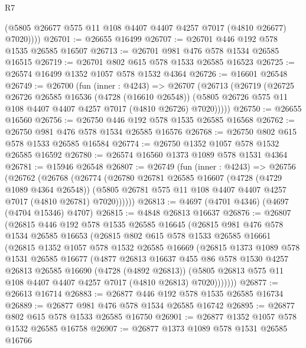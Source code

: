 \begin{lexlean}{R7}
\begin{coremodule}
          (@5805 @26677 @575 @11 @108 @4407 @4407 @4257 @7017 (@4810 @26677) @7020))))
@26701 := @26655 @16499
@26707 := @26701 @446 @192 @578 @1535 @26585 @16507
@26713 := @26701 @981 @476 @578 @1534 @26585 @16515
@26719 := @26701 @802 @615 @578 @1533 @26585 @16523
@26725 := @26574 @16499 @1352 @1057 @578 @1532 @4364
@26726 := @16601 @26548
@26749 := @26700
    (fun (inner : @4243) =>
    @26707
      (@26713
        (@26719
          (@26725
            @26726
            @26585
            @16536
            (@4728 (@16610 @26548))
            (@5805 @26726 @575 @11 @108 @4407 @4407 @4257 @7017 (@4810 @26726) @7020)))))
@26750 := @26655 @16560
@26756 := @26750 @446 @192 @578 @1535 @26585 @16568
@26762 := @26750 @981 @476 @578 @1534 @26585 @16576
@26768 := @26750 @802 @615 @578 @1533 @26585 @16584
@26774 := @26750 @1352 @1057 @578 @1532 @26585 @16592
@26780 := @26574 @16560 @1373 @1089 @578 @1531 @4364
@26781 := @15946 @26548
@26807 := @26749
    (fun (inner : @4243) =>
    @26756
      (@26762
        (@26768
          (@26774
            (@26780
              @26781
              @26585
              @16607
              (@4728 (@4729 @1089 @4364 @26548))
              (@5805 @26781 @575 @11 @108 @4407 @4407 @4257 @7017 (@4810 @26781) @7020))))))
@26813 := @4697 (@4701 @4346) (@4697 (@4704 @15346) @4707)
@26815 := @4848 @26813 @16637
@26876 := @26807
    (@26815
      @446
      @192
      @578
      @1535
      @26585
      @16645
      (@26815
        @981
        @476
        @578
        @1534
        @26585
        @16653
        (@26815
          @802
          @615
          @578
          @1533
          @26585
          @16661
          (@26815
            @1352
            @1057
            @578
            @1532
            @26585
            @16669
            (@26815
              @1373
              @1089
              @578
              @1531
              @26585
              @16677
              (@4877
                @26813
                @16637
                @455
                @86
                @578
                @1530
                @4257
                @26813
                @26585
                @16690
                (@4728 (@4892 @26813))
                (@5805 @26813 @575 @11 @108 @4407 @4407 @4257 @7017 (@4810 @26813) @7020)))))))
@26877 := @26613 @16714
@26883 := @26877 @446 @192 @578 @1535 @26585 @16734
@26889 := @26877 @981 @476 @578 @1534 @26585 @16742
@26895 := @26877 @802 @615 @578 @1533 @26585 @16750
@26901 := @26877 @1352 @1057 @578 @1532 @26585 @16758
@26907 := @26877 @1373 @1089 @578 @1531 @26585 @16766

\end{coremodule}
\end{lexlean}
